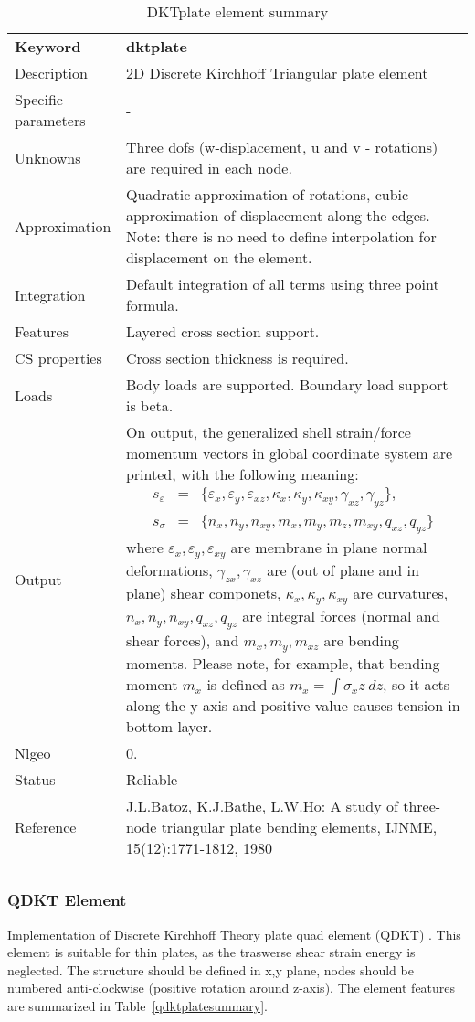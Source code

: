 \documentclass[a4paper]{article}
\newcommand{\param}[1]{\texttt{#1}} %
\newcommand{\templabel}{}%
\newcommand{\tempcaption}{}%
\newcounter{nelpar}
\newenvironment{elementsummary}[5]{%
  \gdef\tempcaption{#4}%
  \gdef\templabel{#5}%
  \setcounter{nelpar}{0}%
  \begin{center} %
    \begin{table}[!htb] %
      \begin{tabular}{|l|p{9cm}|}\hline %
        {\bf Keyword} & \bf{#1}\\ %
        {Description} & {#2}\\ %
        {Specific parameters} & {#3}\\ \hline %
}{
  \\ \hline %
      \end{tabular}%
      \caption{\tempcaption}%
      \label{\templabel}%
    \end{table}%
  \end{center}%
}
\newcommand{\elementParam}[1]{%
  \ifthenelse{\value{nelpar}>0} %
             {&{#1}}%
             {\setcounter{nelpar}{1}Parameters&{#1}}%
             \\%
}
\newcommand{\elementDescription}[2]{{#1} & {#2}\\ }
\begin{document}
\begin{elementsummary}{dktplate}{2D Discrete Kirchhoff Triangular plate element}{-}{DKTplate element summary}{dktplatesummary}
\elementDescription{Unknowns}{Three dofs (w-displacement, u and v - rotations) are required in each node.}
\elementDescription{Approximation}{Quadratic approximation of rotations, cubic approximation of displacement along the edges. Note: there is no need to define interpolation for displacement on the element.}
\elementDescription{Integration}{Default integration of all terms using three point formula.}
\elementDescription{Features}{Layered cross section support.}
\elementDescription{CS properties}{Cross section thickness is required.}
\elementDescription{Loads}{Body loads are supported. Boundary load support is beta.}
\elementDescription{Output}{On output, the generalized shell strain/force momentum vectors in global coordinate system are printed, with the following meaning:
\begin{eqnarray*}
s_{\varepsilon}&=&\{\varepsilon_x, \varepsilon_y, \varepsilon_{xz}, \kappa_x, \kappa_y, \kappa_{xy}, \gamma_{xz}, \gamma_{yz}\},\\
s_{\sigma}&=&\{n_x, n_y, n_{xy}, m_x, m_y, m_z, m_{xy}, q_{xz}, q_{yz}\}
\end{eqnarray*}
where $\varepsilon_x, \varepsilon_y, \varepsilon_{xy}$ are membrane in plane normal deformations, $\gamma_{zx}, \gamma_{xz}$ are (out of plane and in plane) shear componets, $\kappa_x, \kappa_y, \kappa_{xy}$ are curvatures, $n_x, n_y, n_{xy}, q_{xz}, q_{yz}$ are integral forces (normal and shear forces), and $m_x, m_y, m_{xz}$ are bending moments. 
Please note, for example, that bending moment $m_x$ is defined as $m_x=\int \sigma_x z\ dz$, so it acts along the y-axis and positive value causes tension in bottom layer.}
\elementDescription{Nlgeo}{0.}
\elementDescription{Status}{Reliable}
\elementDescription{Reference}{J.L.Batoz, K.J.Bathe, L.W.Ho: A study of three-node triangular plate bending elements, IJNME, 15(12):1771-1812, 1980}
\end{elementsummary}


\subsubsection {QDKT Element}
\label{qdkt}
Implementation of Discrete Kirchhoff Theory plate quad element (QDKT) .
This element is suitable for thin plates, as the traswerse shear strain energy is neglected.
The structure should be defined in x,y plane, nodes should be numbered anti-clockwise (positive rotation around
z-axis). The element features are summarized in Table~\ref{qdktplatesummary}.
\end{document}
